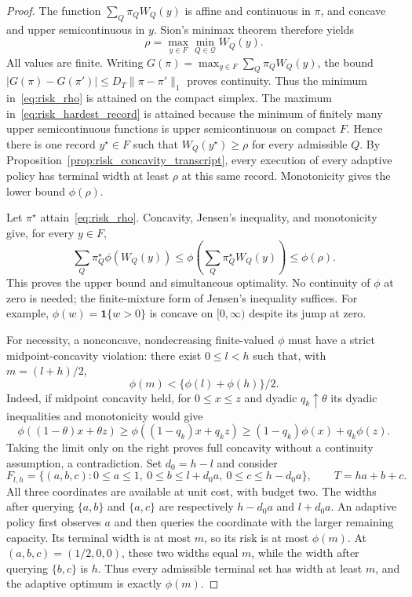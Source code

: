 \documentclass[12pt]{article}
\begin{document}
\begin{proof}
The function $\sum_Q\pi_QW_Q(y)$ is affine and continuous in $\pi$,
and concave and upper semicontinuous in $y$. Sion's minimax theorem \citep{sion1958}
therefore yields
\begin{equation}
 \rho=\max_{y\in F}\min_{Q\in\mathcal Q}W_Q(y).
 \label{eq:risk_hardest_record}
\end{equation}
All values are finite. Writing $G(\pi)=\max_{y\in F}\sum_Q\pi_QW_Q(y)$,
the bound $|G(\pi)-G(\pi')|\le D_T\|\pi-\pi'\|_1$ proves continuity.
Thus the minimum in~\eqref{eq:risk_rho} is attained on the compact simplex.
The maximum in~\eqref{eq:risk_hardest_record} is attained because the
minimum of finitely many upper semicontinuous functions is upper
semicontinuous on compact $F$. Hence there is one record $y^\star\in F$
such that $W_Q(y^\star)\ge\rho$ for every admissible $Q$.
By Proposition~\ref{prop:risk_concavity_transcript}, every execution of
every adaptive policy has terminal width at least $\rho$ at this same
record. Monotonicity gives the lower bound $\phi(\rho)$.

Let $\pi^\star$ attain~\eqref{eq:risk_rho}. Concavity, Jensen's
inequality, and monotonicity give, for every $y\in F$,
\[
 \sum_Q\pi^\star_Q\phi(W_Q(y))
 \le \phi\!\left(\sum_Q\pi^\star_QW_Q(y)\right)
 \le\phi(\rho).
\]
This proves the upper bound and simultaneous optimality. No continuity
of $\phi$ at zero is needed; the finite-mixture form of Jensen's
inequality suffices. For example, $\phi(w)=\boldsymbol{1}\{w>0\}$ is
concave on $[0,\infty)$ despite its jump at zero.

For necessity, a nonconcave, nondecreasing finite-valued $\phi$ must
have a strict midpoint-concavity violation: there exist $0\le l<h$ such
that, with $m=(l+h)/2$,
\begin{equation}
 \phi(m)<\{\phi(l)+\phi(h)\}/2.
 \label{eq:risk_midpoint_violation}
\end{equation}
Indeed, if midpoint concavity held, for $0\le x\le z$ and dyadic
$q_k\uparrow\theta$ its dyadic inequalities and monotonicity would give
\[
\phi((1-\theta)x+\theta z)
\ge\phi((1-q_k)x+q_kz)
\ge(1-q_k)\phi(x)+q_k\phi(z).
\]
Taking the limit only on the right proves full concavity without a
continuity assumption, a contradiction. Set $d_0=h-l$ and consider
\begin{equation}
 F_{l,h}=\{(a,b,c):0\le a\le1,\ 0\le b\le l+d_0a,
                  \ 0\le c\le h-d_0a\},\qquad T=ha+b+c.
 \label{eq:risk_converse_polytope}
\end{equation}
All three coordinates are available at unit cost, with budget two.
The widths after querying $\{a,b\}$ and $\{a,c\}$ are respectively
$h-d_0a$ and $l+d_0a$. An adaptive policy first observes $a$ and then
queries the coordinate with the larger remaining capacity. Its terminal
width is at most $m$, so its risk is at most $\phi(m)$.
At $(a,b,c)=(1/2,0,0)$, these two widths equal $m$, while the width
after querying $\{b,c\}$ is $h$. Thus every admissible terminal set
has width at least $m$, and the adaptive optimum is exactly $\phi(m)$.


\end{proof}
\end{document}
